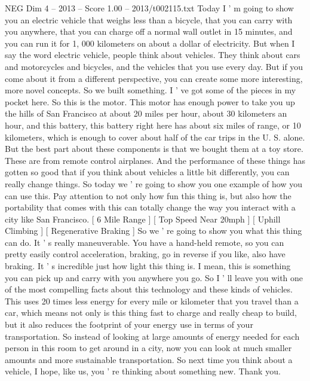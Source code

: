 \begin{textsample}{NEG Dim 4 – 2013 – Score 1.00 – 2013/t002115.txt}  \label{ex:f4_neg_005}
Today I ' m going to show you an electric vehicle that weighs less than a bicycle, that you can carry with you anywhere, that you can charge off a normal wall outlet in 15 minutes, and you can run it for 1, 000 kilometers on about a dollar of electricity.
But when I say the word electric vehicle, people think about vehicles.
They think about cars and motorcycles and bicycles, and the vehicles that you use every day.
But if you come about it from a different perspective, you can create some more interesting, more novel concepts.
So we built something.
I ' ve got some of the pieces in my pocket here.
So this is the motor.
This motor has enough power to take you up the hills of San Francisco at about 20 miles per hour, about 30 kilometers an hour, and this battery, this battery right here has about six miles of range, or 10 kilometers, which is enough to cover about half of the car trips in the U.
S. alone.
But the best part about these components is that we bought them at a toy store.
These are from remote control airplanes.
And the performance of these things has gotten so good that if you think about vehicles a little bit differently, you can really change things.
So today we ' re going to show you one example of how you can use this.
Pay attention to not only how fun this thing is, but also how the portability that comes with this can totally change the way you interact with a city like San Francisco. [ 6 Mile Range ] [ Top Speed Near 20mph ] [ Uphill Climbing ] [ Regenerative Braking ] So we ' re going to show you what this thing can do.
It ' s really maneuverable.
You have a hand-held remote, so you can pretty easily control acceleration, braking, go in reverse if you like, also have braking.
It ' s incredible just how light this thing is.
I mean, this is something you can pick up and carry with you anywhere you go.
So I ' ll leave you with one of the most compelling facts about this technology and these kinds of vehicles.
This uses 20 times less energy for every mile or kilometer that you travel than a car, which means not only is this thing fast to charge and really cheap to build, but it also reduces the footprint of your energy use in terms of your transportation.
So instead of looking at large amounts of energy needed for each person in this room to get around in a city, now you can look at much smaller amounts and more sustainable transportation.
So next time you think about a vehicle, I hope, like us, you ' re thinking about something new.
Thank you.

\end{textsample}
